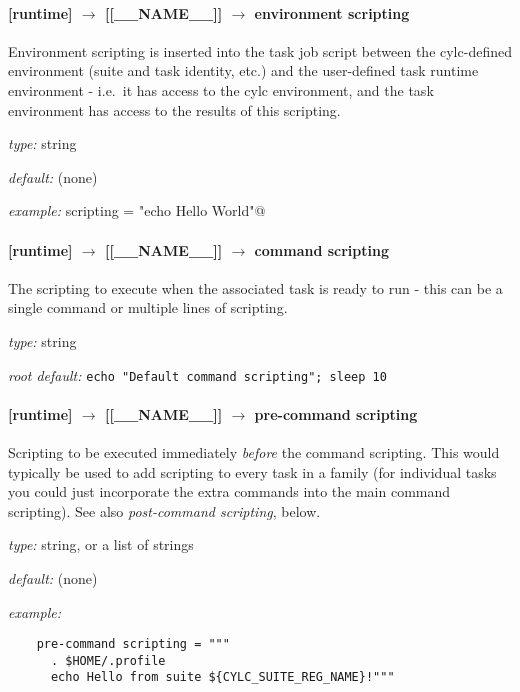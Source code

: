 \paragraph[environment scripting]{[runtime] $\rightarrow$ [[\_\_NAME\_\_]] $\rightarrow$ environment scripting}

Environment scripting is inserted into the task job script between
the cylc-defined environment (suite and task identity, etc.) and the 
user-defined task runtime environment - i.e.\ it has access to the 
cylc environment, and the task environment has access to the results of
this scripting.
\begin{myitemize}
\item {\em type:} string
\item {\em default:} (none)
\item {\em example:} \lstinline@environment scripting = "echo Hello World"@
\end{myitemize}

\paragraph[command scripting]{[runtime] $\rightarrow$ [[\_\_NAME\_\_]] $\rightarrow$ command scripting}

The scripting to execute when the associated task is ready to run - this
can be a single command or multiple lines of scripting. 

\begin{myitemize}
\item {\em type:} string
\item {\em root default:} \lstinline=echo "Default command scripting"; sleep 10=
\end{myitemize}


\paragraph[pre-command scripting]{ [runtime] $\rightarrow$ [[\_\_NAME\_\_]] $\rightarrow$ pre-command scripting}

Scripting to be executed immediately {\em before} the command scripting.
This would typically be used to add scripting to every task in a family
(for individual tasks you could just incorporate the extra commands into
the main command scripting). See also {\em post-command scripting},
below.

\begin{myitemize}
\item {\em type:} string, or a list of strings
\item {\em default:} (none)
\item {\em example:} 
 \begin{lstlisting}
    pre-command scripting = """
      . $HOME/.profile
      echo Hello from suite ${CYLC_SUITE_REG_NAME}!"""
 \end{lstlisting}
\end{myitemize}

